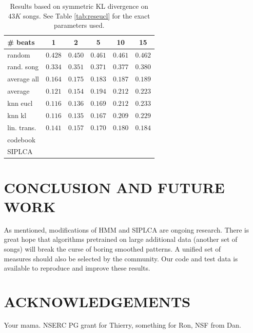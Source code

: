 \documentclass{article}
\begin{document}
\begin{table}[t]
\begin{small}
\begin{center}
\begin{tabular}{l|c|c|c|c|c|}
\# beats & 1 & 2 & 5 & 10 & 15 \\ \hline \hline
random & $0.428$ & $0.450$ & $0.461$ & $0.461$ & $0.462$  \\
rand. song & $0.334$ & $0.351$ & $0.371$ & $0.377$ & $0.380$  \\
average all & $0.164$ & $0.175$ & $0.183$ & $0.187$ & $0.189$ \\ 
average & $0.121$ & $0.154$ & $0.194$ & $0.212$ &  $0.223$ \\ \hline
knn eucl & $\mathbf{0.116}$ & $0.136$ & $0.169$ & $0.212$ & $0.233$ \\
knn kl & $\mathbf{0.116}$ & $\mathbf{0.135}$ & $\mathbf{0.167}$ & $0.209$ & $0.229$ \\
lin. trans. & $0.141$ & $0.157$ & $0.170$ & $\mathbf{0.180}$ & $\mathbf{0.184}$ \\
codebook & & & & &  \\
SIPLCA & & & & &  \\ \hline
\end{tabular}
\caption{Results based on symmetric KL divergence on $43K$ songs.
See Table \ref{tab:reseucl} for the exact parameters used.}
\label{tab:reskl}
\end{center}
\end{small}
\end{table}
\fi

\section{CONCLUSION AND FUTURE WORK}
\label{sec:conclusion}
As mentioned, modifications of HMM and SIPLCA are ongoing
research. There is great hope that algorithms pretrained
on large additional data (another set of songs) will break
the curse of boring smoothed patterns.
A unified set of measures should also be selected
by the community. Our code and test data is available to 
reproduce and improve these results.


\section{ACKNOWLEDGEMENTS}
Your mama.
NSERC PG grant for Thierry, something for Ron, NSF from Dan.




\end{document}
